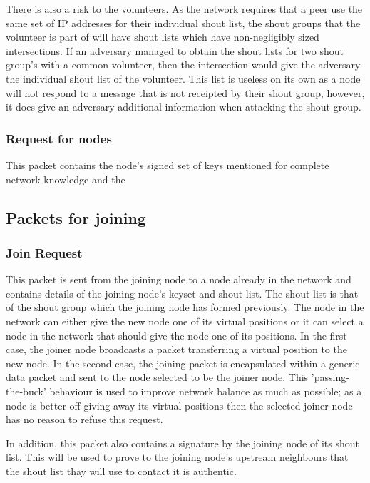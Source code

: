 \documentclass[ %
                    author={Luke Murray},
                supervisor={Dr. Simon Hollis},
                     title={Shadow Peer-to-Peer Networks},
                  subtitle={},
                    degree={MEng},
                      year={2013} ]{thesis}
\begin{document}
There is also a risk to the volunteers. As the network requires that a peer use the same set of IP addresses for their individual shout list, the shout groups that the volunteer is part of will have shout lists which have non-negligibly sized intersections. If an adversary managed to obtain the shout lists for two shout group's with a common volunteer, then the intersection would give the adversary the individual shout list of the volunteer. This list is useless on its own as a node will not respond to a message that is not receipted by their shout group, however, it does give an adversary additional information when attacking the shout group.

\subsubsection{Request for nodes}

This packet contains the node's signed set of keys mentioned for complete network knowledge and the 

\subsection{Packets for joining}

\subsubsection{Join Request}

This packet is sent from the joining node to a node already in the network and contains details of the joining node's keyset and shout list. The shout list is that of the shout group which the joining node has formed previously. The node in the network can either give the new node one of its virtual positions or it can select a node in the network that should give the node one of its positions. In the first case, the joiner node broadcasts a packet transferring a virtual position to the new node. In the second case, the joining packet is encapsulated within a generic data packet and sent to the node selected to be the joiner node. This 'passing-the-buck' behaviour is used to improve network balance as much as possible; as a node is better off giving away its virtual positions then the selected joiner node has no reason to refuse this request.

In addition, this packet also contains a signature by the joining node of its shout list. This will be used to prove to the joining node's upstream neighbours that the shout list thay will use to contact it is authentic.
\end{document}

